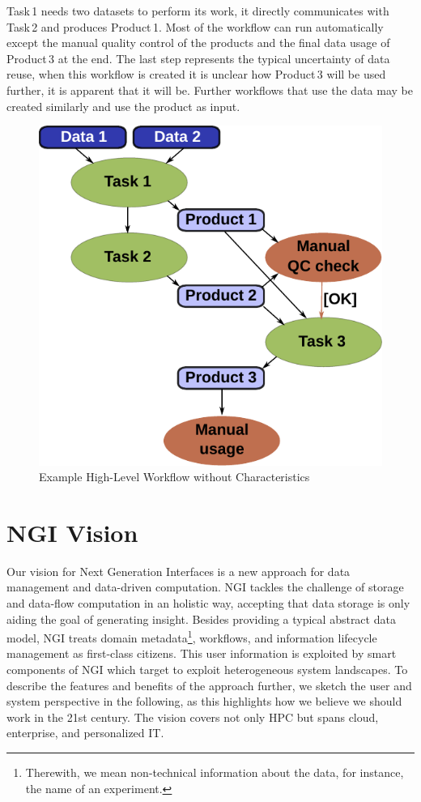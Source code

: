 \documentclass[a4paper, twocolumn]{article}
\begin{document}
Task\,1 needs two datasets to perform its work, it directly communicates with Task\,2 and produces Product\,1.
Most of the workflow can run automatically except the manual quality control of the products and the final data usage of Product\,3 at the end.
The last step represents the typical uncertainty of data reuse, when this workflow is created it is unclear how Product\,3 will be used further, it is apparent that it will be.
Further workflows that use the data may be created similarly and use the product as input.

\begin{figure}[b]
  \centering
  \includegraphics[width=0.75\columnwidth]{workflow}
  \caption{Example High-Level Workflow without Characteristics}
  \label{fig:workflow}
\end{figure}




\section{NGI Vision}

Our vision for Next Generation Interfaces is a new approach for data management and data-driven computation.
NGI tackles the challenge of storage and data-flow computation in an holistic way, accepting that data storage is only aiding the goal of generating insight.
Besides providing a typical abstract data model, NGI treats domain metadata\footnote{Therewith, we mean non-technical information about the data, for instance, the name of an experiment.}, workflows, and information lifecycle management as first-class citizens.
This user information is exploited by smart components of NGI which target to exploit heterogeneous system landscapes.
To describe the features and benefits of the approach further, we sketch the user and system perspective in the following, as this highlights how we believe we should work in the 21st century.
The vision covers not only HPC but spans cloud, enterprise, and personalized IT.
\end{document}
